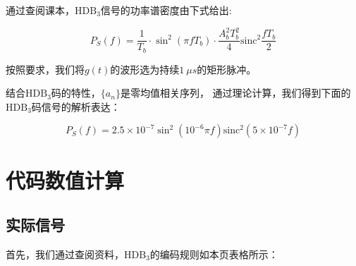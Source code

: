 \documentclass[AutoFakeBold]{LZUThesis}
\begin{document}
通过查阅课本\cite{POCBook}，$\mathrm{HDB_3}$信号的功率谱密度由下式给出:

\begin{equation}
    P_S(f) = \frac{1}{T_b} \cdot \sin^2{(\pi f T_b)} \cdot \frac{A_b^2T_b^2}{4}  \mathrm{sinc}^2{\frac{f T_b}{2}}
\end{equation}

按照要求，我们将$g(t)$的波形选为持续$1~\mu s$的矩形脉冲。

结合$\mathrm{HDB_3}$码的特性，$\{a_n\}$是零均值相关序列，
通过理论计算，我们得到下面的$\mathrm{HDB_3}$码信号的解析表达：

\begin{equation}
    P_S(f) = 2.5\times 10^{-7}\sin^2{(10^{-6}\pi f)} \mathrm{sinc}^2 (5\times 10^{-7} f)
\end{equation}

\section{代码数值计算}
\subsection{实际信号}

首先，我们通过查阅资料，$\mathrm{HDB_3}$的编码规则如本页表格所示：
\end{document}
